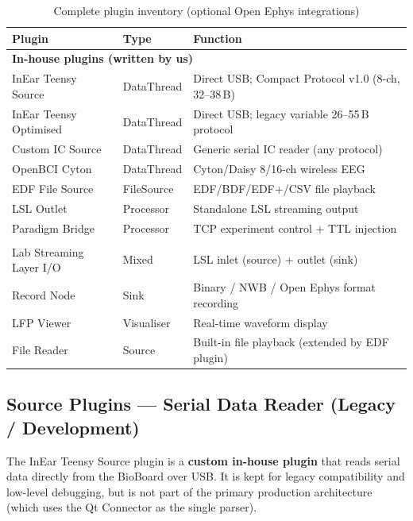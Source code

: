 \documentclass[11pt,a4paper]{article}
\begin{document}
\begin{table}[H]
\centering
\caption{Complete plugin inventory (optional Open Ephys integrations)}
\label{tab:plugin-inventory}
\begin{tabularx}{\textwidth}{l l X}
\toprule
\textbf{Plugin} & \textbf{Type} & \textbf{Function} \\
\midrule
\multicolumn{3}{l}{\textbf{In-house plugins (written by us)}} \\
\addlinespace
InEar Teensy Source         & DataThread & Direct USB; Compact Protocol v1.0 (8-ch, 32--38\,B) \\
InEar Teensy Optimised      & DataThread & Direct USB; legacy variable 26--55\,B protocol \\
Custom IC Source            & DataThread & Generic serial IC reader (any protocol) \\
OpenBCI Cyton               & DataThread & Cyton/Daisy 8/16-ch wireless EEG \\
EDF File Source             & FileSource & EDF/BDF/EDF+/CSV file playback \\
LSL Outlet                  & Processor  & Standalone LSL streaming output \\
Paradigm Bridge             & Processor  & TCP experiment control + TTL injection \\
\addlinespace
\multicolumn{3}{l}{\textbf{Open Ephys community plugins (used as dependencies)}} \\
\addlinespace
Lab Streaming Layer I/O     & Mixed      & LSL inlet (source) + outlet (sink) \\
Record Node                 & Sink       & Binary / NWB / Open Ephys format recording \\
LFP Viewer                  & Visualiser & Real-time waveform display \\
File Reader                 & Source     & Built-in file playback (extended by EDF plugin) \\
\bottomrule
\end{tabularx}
\end{table}

\subsection{Source Plugins — Serial Data Reader (Legacy / Development)}

The InEar Teensy Source plugin is a \textbf{custom in-house plugin}
that reads serial data directly from the BioBoard over USB. It is kept for
legacy compatibility and low-level debugging, but is not part of the primary
production architecture (which uses the Qt Connector as the single parser).
\end{document}
